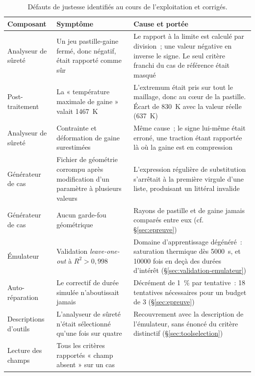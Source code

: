 \documentclass[12pt,a4paper,french]{report}
\begin{document}
\begin{table}[htbp]
\centering
\caption[Défauts de justesse identifiés]{Défauts de justesse identifiés au cours de l'exploitation et corrigés.}
\label{tab:bugs}
\small
\begin{tabularx}{\textwidth}{@{}>{\raggedright\arraybackslash}p{3.3cm}XX@{}}
\toprule
\textbf{Composant} & \textbf{Symptôme} & \textbf{Cause et portée}\\
\midrule
Analyseur de sûreté & Un jeu pastille-gaine fermé, donc négatif, était
  rapporté comme sûr & Le rapport à la limite est calculé par division~;
  une valeur négative en inverse le signe. Le seul critère franchi du cas de
  référence était masqué\\
\addlinespace
Post-traitement & La « température maximale de gaine » valait
  \SI{1467}{\kelvin} & L'extremum était pris sur tout le maillage, donc au
  c\oe ur de la pastille. Écart de \SI{830}{\kelvin} avec la valeur réelle
  (\SI{637}{\kelvin})\\
\addlinespace
Analyseur de sûreté & Contrainte et déformation de gaine surestimées &
  Même cause~; le signe lui-même était erroné, une traction étant rapportée
  là où la gaine est en compression\\
\addlinespace
Générateur de cas & Fichier de géométrie corrompu après modification d'un
  paramètre à plusieurs valeurs & L'expression régulière de substitution
  s'arrêtait à la première virgule d'une liste, produisant un littéral
  invalide\\
\addlinespace
Générateur de cas & Aucun garde-fou géométrique & Rayons de pastille et de
  gaine jamais comparés entre eux (cf. §\ref{sec:epreuve})\\
\addlinespace
Émulateur & Validation \textit{leave-one-out} à $R^2 > 0{,}998$ &
  Domaine d'apprentissage dégénéré~: saturation thermique dès
  \SI{5000}{\second}, et \num{10000} fois en deçà des durées d'intérêt
  (§\ref{sec:validation-emulateur})\\
\addlinespace
Auto-réparation & Le correctif de durée simulée n'aboutissait jamais &
  Décrément de \SI{1}{\percent} par tentative~: \num{18} tentatives
  nécessaires pour un budget de \num{3} (§\ref{sec:epreuve})\\
\addlinespace
Descriptions d'outils & L'analyseur de sûreté n'était sélectionné qu'une fois
  sur quatre & Recouvrement avec la description de l'émulateur, sans énoncé du
  critère distinctif (§\ref{sec:toolselection})\\
\addlinespace
Lecture des champs & Tous les critères rapportés « champ absent » sur un cas

\end{tabularx}
\end{table}
\end{document}
